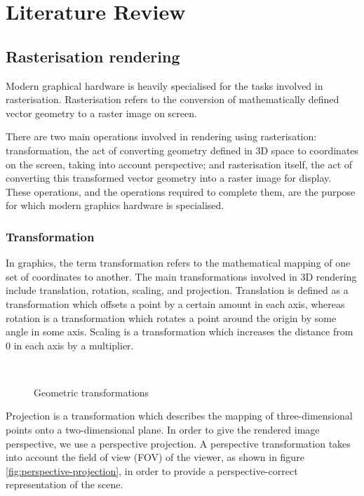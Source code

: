 \chapter{Literature Review}
\label{litreview}

\section{Rasterisation rendering}
Modern graphical hardware is heavily specialised for the tasks involved in rasterisation. Rasterisation refers to the conversion of mathematically defined vector geometry to a raster image on screen.

There are two main operations involved in rendering using rasterisation: transformation, the act of converting geometry defined in 3D space to coordinates on the screen, taking into account perspective; and rasterisation itself, the act of converting this transformed vector geometry into a raster image for display. These operations, and the operations required to complete them, are the purpose for which modern graphics hardware is specialised.

\subsection{Transformation}
In graphics, the term transformation refers to the mathematical mapping of one set of coordinates to another. The main transformations involved in 3D rendering include translation, rotation, scaling, and projection. Translation is defined as a transformation which offsets a point by a certain amount in each axis, whereas rotation is a transformation which rotates a point around the origin by some angle in some axis. Scaling is a transformation which increases the distance from 0 in each axis by a multiplier.

\begin{figure}
	\centering
	~
	~

	\caption{Geometric transformations}
	\label{fig:transformations}
\end{figure}

Projection is a transformation which describes the mapping of three-dimensional points onto a two-dimensional plane. In order to give the rendered image perspective, we use a perspective projection. A perspective transformation takes into account the field of view (FOV) of the viewer, as shown in figure \ref{fig:perspective-projection}, in order to provide a perspective-correct representation of the scene.

